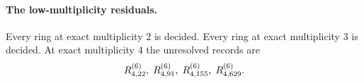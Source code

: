 \paragraph{The low-multiplicity residuals.}
Every ring at exact multiplicity 2 is decided.
Every ring at exact multiplicity 3 is decided.
At exact multiplicity 4 the unresolved records are
\[\begin{gathered}
R^{(6)}_{4,22},\;R^{(6)}_{4,91},\;R^{(6)}_{4,155},\;R^{(6)}_{4,629}.
\end{gathered}\]
